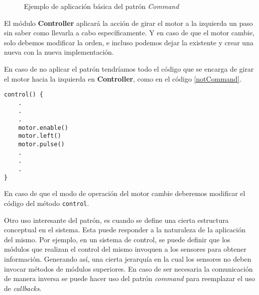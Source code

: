 \begin{figure}[h]
\caption{Ejemplo de aplicación básica del patrón \textit{Command}}
\begin{center}
\end{center}
\end{figure}

El módulo \textbf{Controller} aplicará la acción de girar el motor a la izquierda un paso sin saber como llevarla a cabo específicamente. Y en caso de que el motor cambie, solo debemos modificar la orden, e incluso podemos dejar la existente y crear una nueva con la nueva implementación.

En caso de no aplicar el patrón tendríamos todo el código que se encarga de girar el motor hacia la izquierda en \textbf{Controller}, como en el código \ref{notCommand}.

\begin{lstlisting}[label={notCommand}, caption=Ejemplo de implementación sin usar el patrón \textit{Command}.]
control() {
    .
    .
    .
    motor.enable()
    motor.left()
    motor.pulse()
    .
    .
    .  
}
\end{lstlisting}

En caso de que el modo de operación del motor cambie deberemos modificar el código del método \verb|control|.

Otro uso interesante del patrón, es cuando se define una cierta estructura conceptual en el sistema. Esta puede responder a la naturaleza de la aplicación del mismo. Por ejemplo, en un sistema de control, se puede definir que los módulos que realizan el control del mismo invoquen a los sensores para obtener información. Generando así, una cierta jerarquía en la cual los sensores no deben invocar métodos de módulos superiores. En caso de ser necesaria la comunicación de manera inversa se puede hacer uso del patrón \textit{command} para reemplazar el uso de \textit{callbacks}.


